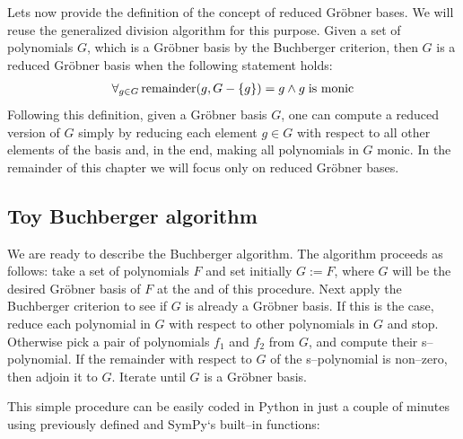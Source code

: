 Lets now provide the definition of the concept of reduced Gröbner bases. We will reuse the generalized
division algorithm for this purpose. Given a set of polynomials $G$, which is a Gröbner basis by the
Buchberger criterion, then $G$ is a reduced Gröbner basis when the following statement holds:
\begin{gather}
\begin{split}\forall_{g \in G} \operatorname{remainder}(g, G - \{g\}) = g \wedge g\;\mbox{is monic}\end{split}\notag
\end{gather}
Following this definition, given a Gröbner basis $G$, one can compute a reduced version of $G$
simply by reducing each element $g \in G$ with respect to all other elements of the basis and, in
the end, making all polynomials in $G$ monic. In the remainder of this chapter we will focus only
on reduced Gröbner bases.
\subsection{Toy Buchberger algorithm}\label{gb-toy}

We are ready to describe the Buchberger algorithm. The algorithm proceeds as follows: take a
set of polynomials $F$ and set initially $G := F$, where $G$ will be the desired Gröbner
basis of $F$ at the and of this procedure. Next apply the Buchberger criterion to see if
$G$ is already a Gröbner basis. If this is the case, reduce each polynomial in $G$ with
respect to other polynomials in $G$ and stop. Otherwise pick a pair of polynomials $f_1$ and
$f_2$ from $G$, and compute their s--polynomial. If the remainder with respect to $G$ of the
s--polynomial is non--zero, then adjoin it to $G$. Iterate until $G$ is a Gröbner basis.

This simple procedure can be easily coded in Python in just a couple of minutes using previously
defined  and SymPy`s built--in  functions:

